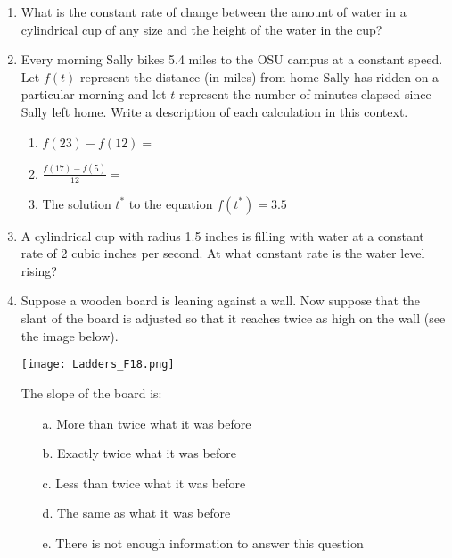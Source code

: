 \documentclass[12pt]{report}
\begin{document}
\begin{enumerate}

\item What is the constant rate of change between the amount of water in a cylindrical cup of any size and the height of the water in the cup?

\item Every morning Sally bikes 5.4 miles to the OSU campus at a constant speed. Let $f(t)$ represent the distance (in miles) from home Sally has ridden on a particular morning and let $t$ represent the number of minutes elapsed since Sally left home. Write a description of each calculation in this context. 

\begin{enumerate}

\item $f(23)-f(12)=$

\item $\frac{f(17)-f(5)}{12}=$

\item The solution $t^*$ to the equation $f(t^*)=3.5$

\end{enumerate}

\item A cylindrical cup with radius 1.5 inches is filling with water at a constant rate of 2 cubic inches per second. At what constant rate is the water level rising?

\item Suppose a wooden board is leaning against a wall. Now suppose that the slant of the board is adjusted so that it reaches twice as high on the wall (see the image below).
\begin{center}
\texttt{[image: Ladders\_F18.png]}
\end{center}
The slope of the board is: \vspace{0.2cm}
\begin{enumerate}
\item [a.] More than twice what it was before
\item [b.] Exactly twice what it was before
\item [c.] Less than twice what it was before
\item [d.] The same as what it was before
\item [e.] There is not enough information to answer this question
\end{enumerate}

\pagebreak


\end{enumerate}
\end{document}
